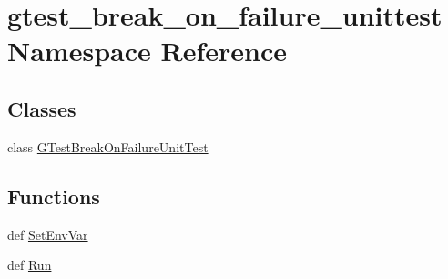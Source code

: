 \hypertarget{namespacegtest__break__on__failure__unittest}{\section{gtest\-\_\-break\-\_\-on\-\_\-failure\-\_\-unittest \-Namespace \-Reference}
\label{d2/dcc/namespacegtest__break__on__failure__unittest}
}
\subsection*{\-Classes}
\begin{DoxyCompactItemize}
\item 
class \hyperlink{classgtest__break__on__failure__unittest_1_1GTestBreakOnFailureUnitTest}{\-G\-Test\-Break\-On\-Failure\-Unit\-Test}
\end{DoxyCompactItemize}
\subsection*{\-Functions}
\begin{DoxyCompactItemize}
\item 
def \hyperlink{namespacegtest__break__on__failure__unittest_ac74812cd685cbd9df906b202a0143340}{\-Set\-Env\-Var}
\item 
def \hyperlink{namespacegtest__break__on__failure__unittest_ae784214748d2010e70d5519ce618af5f}{\-Run}
\end{DoxyCompactItemize}
